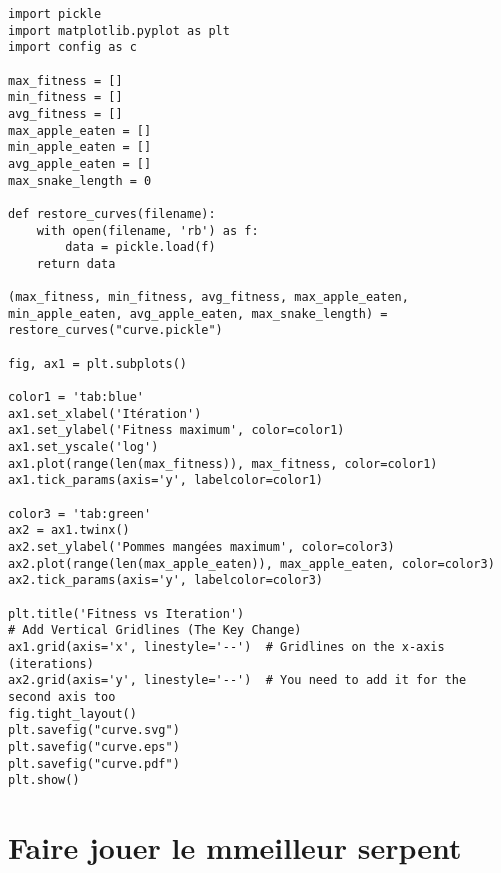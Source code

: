 \documentclass[11pt,a4paper]{article}
\begin{document}
\begin{verbatim}
import pickle
import matplotlib.pyplot as plt
import config as c

max_fitness = []
min_fitness = []
avg_fitness = []
max_apple_eaten = []
min_apple_eaten = []
avg_apple_eaten = []
max_snake_length = 0

def restore_curves(filename):
    with open(filename, 'rb') as f:
        data = pickle.load(f)
    return data

(max_fitness, min_fitness, avg_fitness, max_apple_eaten, min_apple_eaten, avg_apple_eaten, max_snake_length) = restore_curves("curve.pickle")

fig, ax1 = plt.subplots()

color1 = 'tab:blue'
ax1.set_xlabel('Itération')
ax1.set_ylabel('Fitness maximum', color=color1)
ax1.set_yscale('log')
ax1.plot(range(len(max_fitness)), max_fitness, color=color1)
ax1.tick_params(axis='y', labelcolor=color1)

color3 = 'tab:green'
ax2 = ax1.twinx()
ax2.set_ylabel('Pommes mangées maximum', color=color3)
ax2.plot(range(len(max_apple_eaten)), max_apple_eaten, color=color3)
ax2.tick_params(axis='y', labelcolor=color3)

plt.title('Fitness vs Iteration')
# Add Vertical Gridlines (The Key Change)
ax1.grid(axis='x', linestyle='--')  # Gridlines on the x-axis (iterations)
ax2.grid(axis='y', linestyle='--')  # You need to add it for the second axis too
fig.tight_layout()
plt.savefig("curve.svg")
plt.savefig("curve.eps")
plt.savefig("curve.pdf")
plt.show()
\end{verbatim}

\section{Faire jouer le mmeilleur serpent}
\end{document}
